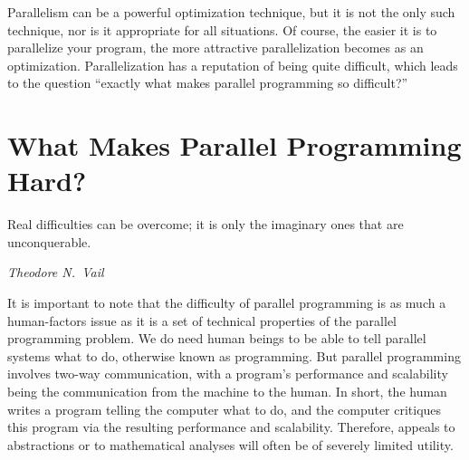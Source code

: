 \QuickQuizEnd

Parallelism can be a powerful optimization technique, but
it is not the only such technique, nor is it appropriate for all
situations.
Of course, the easier it is to parallelize your program, the
more attractive parallelization becomes as an optimization.
Parallelization has a reputation of being quite difficult,
which leads to the question ``exactly what makes parallel
programming so difficult?''

\section{What Makes Parallel Programming Hard?}
\label{sec:intro:What Makes Parallel Programming Hard?}
%
\epigraph{Real difficulties can be overcome; it is only the imaginary
	  ones that are unconquerable.}{\emph{Theodore N.~Vail}}


It is important to note that the difficulty of parallel programming
is as much a human-factors issue as it is a set of technical properties of the
parallel programming problem.
We do need human beings to be able to tell parallel
systems what to do, otherwise known as programming.
But parallel programming involves two-way communication, with
a program's performance and scalability being the communication from
the machine to the human.
In short, the human writes a program telling the computer what to do,
and the computer critiques this program via the resulting performance and
scalability.
Therefore, appeals to abstractions or to mathematical analyses will
often be of severely limited utility.

